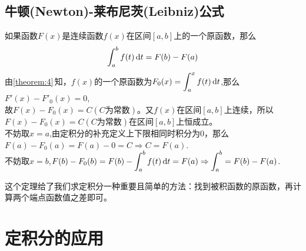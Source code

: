 \subsection{牛顿(Newton)-莱布尼茨(Leibniz)公式}

\theorem[微积分基本定理]
\label{theorem:4.8}
如果函数$F(x)$是连续函数$f(x)$在区间$[a,b]$上的一个原函数，那么
\begin{equation}
	\int_{a}^{b}f(t)\,{\rm{d}} t=F(b)-F(a)
\end{equation}
\proof 由\ref{theorem:4}$\,$知，$f(x)$的一个原函数为$\displaystyle F_0(x)=\int_{a}^{x}f(t)\,{\rm{d}} t$,那么$F'(x)-F'_0(x)=0$,\\
故$F(x)-F_0(x)=C(C\text{为常数})$。又$f(x)$在区间$[a,b]$上连续，所以$F(x)-F_0(x)=C(C\text{为常数})$在区间$[a,b]$上恒成立。\\
不妨取$x=a$,由定积分的补充定义上下限相同时积分为0，那么$F(a)-F_0(a)=F(a)-0=C\Rightarrow C=F(a)$.\vspace{0.5em}\\
不妨取$x=b$,$\displaystyle F(b)-F_0(b)=F(b)-\int_{a}^{b}f(t)\,{\rm{d}} t=F(a) \Rightarrow \int_{a}^{b}=F(b)-F(a)$.
\par 这个定理给了我们求定积分一种重要且简单的方法：找到被积函数的原函数，再计算两个端点函数值之差即可。
\section{定积分的应用}
